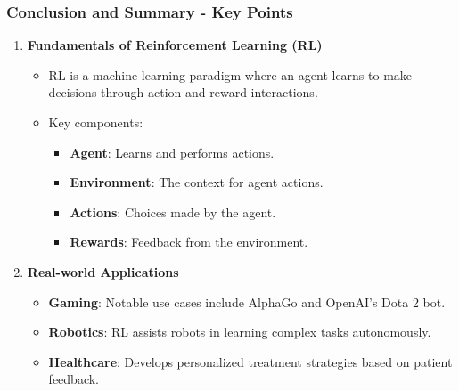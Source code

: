 \documentclass[aspectratio=169]{beamer}
\begin{document}
\begin{frame}[fragile]
    \frametitle{Conclusion and Summary - Key Points}
    \begin{enumerate}
        \item \textbf{Fundamentals of Reinforcement Learning (RL)}
        \begin{itemize}
            \item RL is a machine learning paradigm where an agent learns to make decisions through action and reward interactions.
            \item Key components:
                \begin{itemize}
                    \item \textbf{Agent}: Learns and performs actions.
                    \item \textbf{Environment}: The context for agent actions.
                    \item \textbf{Actions}: Choices made by the agent.
                    \item \textbf{Rewards}: Feedback from the environment.
                \end{itemize}
        \end{itemize}
        
        \item \textbf{Real-world Applications}
        \begin{itemize}
            \item \textbf{Gaming}: Notable use cases include AlphaGo and OpenAI’s Dota 2 bot.
            \item \textbf{Robotics}: RL assists robots in learning complex tasks autonomously.
            \item \textbf{Healthcare}: Develops personalized treatment strategies based on patient feedback.
        \end{itemize}
    \end{enumerate}
\end{frame}
\end{document}
